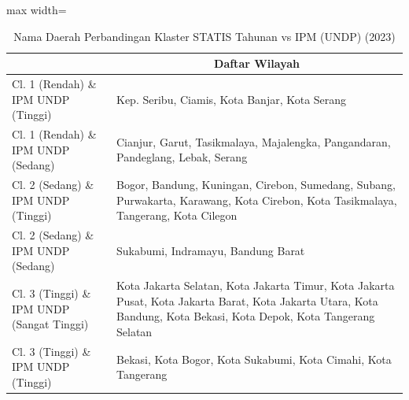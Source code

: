 \begin{table}[H]
\centering
\caption{Nama Daerah Perbandingan Klaster STATIS Tahunan vs IPM (UNDP) (2023)} \label{tab:app1statis_ipm_name_2023}
\begin{adjustbox}{max width=\textwidth}
\begin{tabular}{|>{\centering\arraybackslash}p{4cm}|p{10cm}|}
\hline
\multicolumn{1}{|c|}{\textbf{Kategori}} & \multicolumn{1}{c|}{\textbf{Daftar Wilayah}} \\
\hline
Cl. 1 (Rendah) \& IPM UNDP (Tinggi) & Kep. Seribu, Ciamis, Kota Banjar, Kota Serang \\
\hline
Cl. 1 (Rendah) \& IPM UNDP (Sedang) & Cianjur, Garut, Tasikmalaya, Majalengka, Pangandaran, Pandeglang, Lebak, Serang \\
\hline
Cl. 2 (Sedang) \& IPM UNDP (Tinggi) & Bogor, Bandung, Kuningan, Cirebon, Sumedang, Subang, Purwakarta, Karawang, Kota Cirebon, Kota Tasikmalaya, Tangerang, Kota Cilegon \\
\hline
Cl. 2 (Sedang) \& IPM UNDP (Sedang) & Sukabumi, Indramayu, Bandung Barat \\
\hline
Cl. 3 (Tinggi) \& IPM UNDP (Sangat Tinggi) & Kota Jakarta Selatan, Kota Jakarta Timur, Kota Jakarta Pusat, Kota Jakarta Barat, Kota Jakarta Utara, Kota Bandung, Kota Bekasi, Kota Depok, Kota Tangerang Selatan \\
\hline
Cl. 3 (Tinggi) \& IPM UNDP (Tinggi) & Bekasi, Kota Bogor, Kota Sukabumi, Kota Cimahi, Kota Tangerang \\
\hline
\end{tabular}
\end{adjustbox}
\end{table}